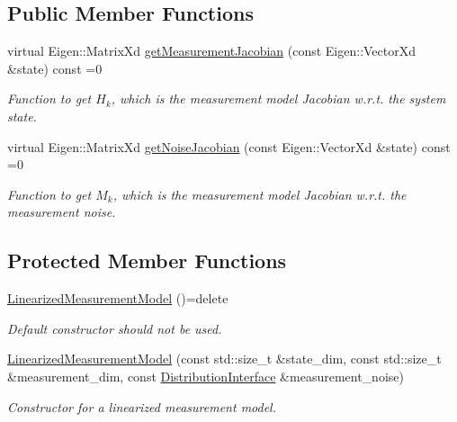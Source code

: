 \subsection*{Public Member Functions}
\begin{DoxyCompactItemize}
\item 
virtual Eigen\+::\+Matrix\+Xd \hyperlink{classrefill_1_1LinearizedMeasurementModel_a1a9fbbf32f4e71b666ee6609cdc99da7}{get\+Measurement\+Jacobian} (const Eigen\+::\+Vector\+Xd \&state) const =0
\begin{DoxyCompactList}\small\item\em Function to get $ H_k $, which is the measurement model Jacobian w.\+r.\+t. the system state. \end{DoxyCompactList}\item 
virtual Eigen\+::\+Matrix\+Xd \hyperlink{classrefill_1_1LinearizedMeasurementModel_a3573eb964dd7bff58b05af85fa46a8a0}{get\+Noise\+Jacobian} (const Eigen\+::\+Vector\+Xd \&state) const =0
\begin{DoxyCompactList}\small\item\em Function to get $ M_k $, which is the measurement model Jacobian w.\+r.\+t. the measurement noise. \end{DoxyCompactList}\end{DoxyCompactItemize}
\subsection*{Protected Member Functions}
\begin{DoxyCompactItemize}
\item 
\hyperlink{classrefill_1_1LinearizedMeasurementModel_ac87d48f8d870169199cdb34a643c4286}{Linearized\+Measurement\+Model} ()=delete
\begin{DoxyCompactList}\small\item\em Default constructor should not be used. \end{DoxyCompactList}\item 
\hyperlink{classrefill_1_1LinearizedMeasurementModel_a9acbec9c9d778a53ba395e7a2fe1ecfa}{Linearized\+Measurement\+Model} (const std\+::size\+\_\+t \&state\+\_\+dim, const std\+::size\+\_\+t \&measurement\+\_\+dim, const \hyperlink{classrefill_1_1DistributionInterface}{Distribution\+Interface} \&measurement\+\_\+noise)
\begin{DoxyCompactList}\small\item\em Constructor for a linearized measurement model. \end{DoxyCompactList}\end{DoxyCompactItemize}


